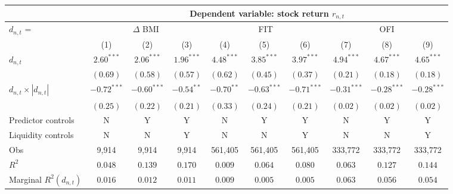 \begin{tabular}{lccccccccc}
  \hline & \multicolumn{9}{c}{Dependent variable: stock return $r_{n,t}$} \\
 \hline $d_{n,t}$ = & \multicolumn{3}{c}{$\Delta$ BMI} & \multicolumn{3}{c}{FIT} & \multicolumn{3}{c}{OFI} \\
 \cmidrule(l){2-4} \cmidrule(l){5-7} \cmidrule(l){8-10}
  \vspace{5pt} & (1) & (2) & (3) & (4) & (5) & (6) & (7) & (8) & (9) \\ 
  $d_{n,t}$ & $2.60^{***}$ & $2.06^{***}$ & $1.96^{***}$ & $4.48^{***}$ & $3.85^{***}$ & $3.97^{***}$ & $4.94^{***}$ & $4.67^{***}$ & $4.65^{***}$ \\ 
   & $(0.69)$ & $(0.58)$ & $(0.57)$ & $(0.62)$ & $(0.45)$ & $(0.37)$ & $(0.21)$ & $(0.18)$ & $(0.18)$ \\ 
  $d_{n,t} \times |d_{n,t}|$ & $-0.72^{***}$ & $-0.60^{***}$ & $-0.54^{**}$ & $-0.70^{**}$ & $-0.63^{***}$ & $-0.71^{***}$ & $-0.31^{***}$ & $-0.28^{***}$ & $-0.28^{***}$ \\ 
   \vspace{5pt} & $(0.25)$ & $(0.22)$ & $(0.21)$ & $(0.33)$ & $(0.24)$ & $(0.21)$ & $(0.02)$ & $(0.02)$ & $(0.02)$ \\ 
  Predictor controls & N & Y & Y & N & Y & Y & N & Y & Y \\ 
   \vspace{5pt}Liquidity controls & N & N & Y & N & N & Y & N & N & Y \\ 
   \vspace{5pt}Obs & 9,914 & 9,914 & 9,914 & 561,405 & 561,405 & 561,405 & 333,772 & 333,772 & 333,772 \\ 
  $R^2$ & $0.048$ & $0.139$ & $0.170$ & $0.009$ & $0.064$ & $0.080$ & $0.063$ & $0.127$ & $0.144$ \\ 
  Marginal $R^2(d_{n,t})$ & $0.016$ & $0.012$ & $0.011$ & $0.009$ & $0.005$ & $0.005$ & $0.063$ & $0.056$ & $0.054$ \\ 
   \hline 
\end{tabular}
